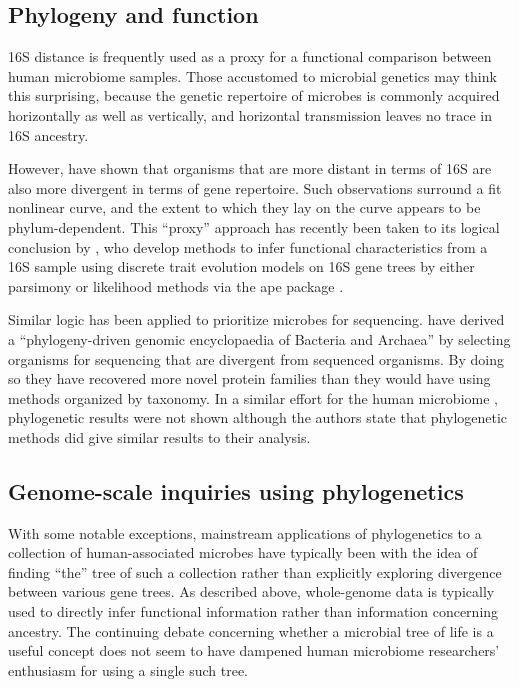 \documentclass{amsart}
\begin{document}
\subsection{Phylogeny and function}

16S distance is frequently used as a proxy for a functional comparison between human microbiome samples.
Those accustomed to microbial genetics may think this surprising, because the genetic repertoire of microbes is commonly acquired horizontally as well as vertically, and horizontal transmission leaves no trace in 16S ancestry.

However, \citet{zaneveld2010ribosomal} have shown that organisms that are more distant in terms of 16S are also more divergent in terms of gene repertoire.
Such observations surround a fit nonlinear curve, and the extent to which they lay on the curve appears to be phylum-dependent.
This ``proxy'' approach has recently been taken to its logical conclusion by \citet{langille2013predictive}, who develop methods to infer functional characteristics from a 16S sample using discrete trait evolution models on 16S gene trees by either parsimony \citep{kluge1969quantitative} or likelihood \citep{pagel1994detecting} methods via the ape package \citep{paradis2004ape}.

Similar logic has been applied to prioritize microbes for sequencing.
\citet{wu2009phylogeny} have derived a ``phylogeny-driven genomic encyclopaedia of Bacteria and Archaea'' by selecting organisms for sequencing that are divergent from sequenced organisms.
By doing so they have recovered more novel protein families than they would have using methods organized by taxonomy.
In a similar effort for the human microbiome \citep{fodor2012most}, phylogenetic results were not shown although the authors state that phylogenetic methods did give similar results to their analysis.


\subsection{Genome-scale inquiries using phylogenetics}
With some notable exceptions, mainstream applications of phylogenetics to a collection of human-associated microbes have typically been with the idea of finding ``the'' tree of such a collection rather than explicitly exploring divergence between various gene trees.
As described above, whole-genome data is typically used to directly infer functional information rather than information concerning ancestry.
The continuing debate concerning whether a microbial tree of life is a useful concept \citep{bapteste2009prokaryotic,caro2012bacterial} does not seem to have dampened human microbiome researchers' enthusiasm for using a single such tree.
\end{document}
